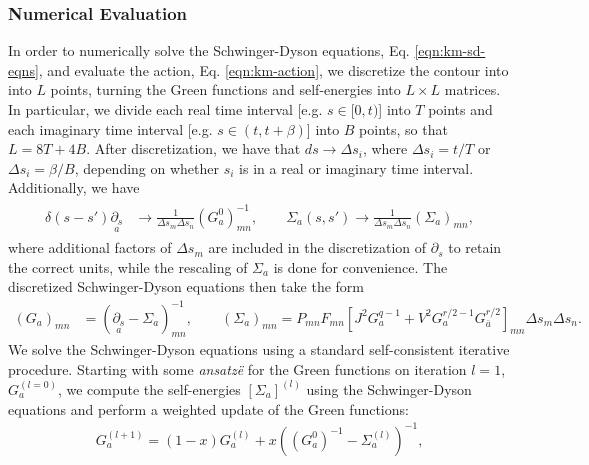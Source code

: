 \documentclass[reprint, floatfix,eqsecnum,superscriptaddress,preprint,nofootinbib,onecolumn,amsmath,amssymb,aps,prb]{revtex4-2}
\begin{document}
\subsubsection{Numerical Evaluation}

In order to numerically solve the Schwinger-Dyson equations, Eq. \eqref{eqn:km-sd-eqns}, and evaluate the action, Eq. \eqref{eqn:km-action}, we discretize the contour into into $L$ points, turning the Green functions and self-energies into $L \times L$ matrices. In particular, we divide each real time interval
[e.g. $s \in [0,t)$] into $T$ points and each imaginary time interval [e.g. $s \in (t,t+\beta)$] into $B$ points, so that $L = 8T + 4B$. 
After discretization, we have that $ds \to \Delta s_i$, where $\Delta s_i = t/T$ or $\Delta s_i = \beta/B$,  depending on whether $s_i$ is in a real or imaginary time interval. %
Additionally, we have
\begin{align}
    \begin{split}
	\delta(s-s')\underset{a}{\partial_s} &\to \frac{1}{\Delta s_m \Delta s_n}(G_{a}^0)^{-1}_{mn}, \qquad %
	\Sigma_a(s,s') \to \frac{1}{\Delta s_m \Delta s_n} (\Sigma_a)_{mn}, %
	\end{split}
\end{align}
where additional factors of $\Delta s_m$ are included in the discretization of $\partial_s$ to retain the correct units, while the rescaling of $\Sigma_a$ is done for convenience.
The discretized Schwinger-Dyson equations then take the form
\begin{align}
	(G_a)_{mn} &= (\underset{a}{\partial_s} - \Sigma_{a})^{-1}_{mn} , \qquad  (\Sigma_a)_{mn} = P_{mn} F_{mn} \left[J^2 G_a^{q-1} + V^2 G_a^{r/2-1} G_{\bar{a}}^{r/2}\right]_{mn} \Delta s_m \Delta s_n.
\end{align}
We solve the Schwinger-Dyson equations using a standard self-consistent iterative procedure. Starting with some \textit{ansatz\"e} for the Green functions on iteration $l=1$, $G_a^{(l=0)}$, we compute the self-energies $[\Sigma_a]^{(l)}$ using the Schwinger-Dyson equations and perform a weighted update of the Green functions:
\begin{align}
    G_a^{(l+1)} = (1-x)G_a^{(l)} + x \left( (G_{a}^0)^{-1} - \Sigma_a^{(l)} \right)^{-1} ,
\end{align}
\end{document}
